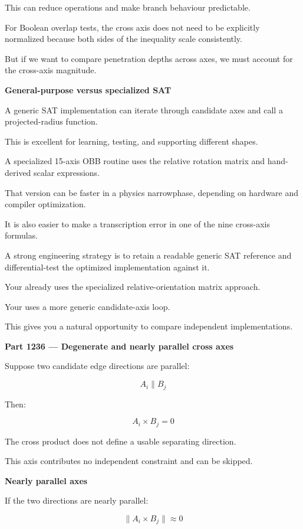 This can reduce operations and make branch behaviour predictable.

For Boolean overlap tests, the cross axis does not need to be explicitly normalized because both sides of the inequality scale consistently.

But if we want to compare penetration depths across axes, we must account for the cross-axis magnitude.

\textbf{General-purpose versus specialized SAT}

A generic SAT implementation can iterate through candidate axes and call a projected-radius function.

This is excellent for learning, testing, and supporting different shapes.

A specialized 15-axis OBB routine uses the relative rotation matrix and hand-derived scalar expressions.

That version can be faster in a physics narrowphase, depending on hardware and compiler optimization.

It is also easier to make a transcription error in one of the nine cross-axis formulas.

A strong engineering strategy is to retain a readable generic SAT reference and differential-test the optimized implementation against it.

Your  already uses the specialized relative-orientation matrix approach.

Your  uses a more generic candidate-axis loop.

This gives you a natural opportunity to compare independent implementations.

\textbf{Part 1236 --- Degenerate and nearly parallel cross axes}

Suppose two candidate edge directions are parallel:

\[
A_i\parallel B_j
\]

Then:

\[
\boxed{ A_i\times B_j=0 }
\]

The cross product does not define a usable separating direction.

This axis contributes no independent constraint and can be skipped.

\textbf{Nearly parallel axes}

If the two directions are nearly parallel:

\[
\|A_i\times B_j\|\approx0
\]

